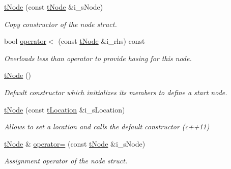 \begin{DoxyCompactItemize}
\mbox{\hyperlink{structplanner_1_1t_node_a18891f54e73f974f1142fba95887de98}{t\+Node}} (const \mbox{\hyperlink{structplanner_1_1t_node}{t\+Node}} \&i\+\_\+s\+Node)
\begin{DoxyCompactList}\small\item\em Copy constructor of the node struct. \end{DoxyCompactList}\item 
bool \mbox{\hyperlink{structplanner_1_1t_node_a5085f3fcf4a960ed9fe14068f1b5e950}{operator$<$}} (const \mbox{\hyperlink{structplanner_1_1t_node}{t\+Node}} \&i\+\_\+rhs) const
\begin{DoxyCompactList}\small\item\em Overloads less than operator to provide hasing for this node. \end{DoxyCompactList}\item 
\mbox{\hyperlink{structplanner_1_1t_node_a83ff217ef060b93698045b2357999594}{t\+Node}} ()
\begin{DoxyCompactList}\small\item\em Default constructor which initializes its members to define a start node. \end{DoxyCompactList}\item 
\mbox{\label{structplanner_1_1t_node_a6728fd921145674d77dec553aad10824}} 
\mbox{\hyperlink{structplanner_1_1t_node_a6728fd921145674d77dec553aad10824}{t\+Node}} (const \mbox{\hyperlink{structplanner_1_1t_location}{t\+Location}} \&i\+\_\+s\+Location)
\begin{DoxyCompactList}\small\item\em Allows to set a location and calls the default constructor (c++11) \end{DoxyCompactList}\item 
\mbox{\label{structplanner_1_1t_node_abcbfb81ac371e43234f66072547af049}} 
\mbox{\hyperlink{structplanner_1_1t_node}{t\+Node}} \& \mbox{\hyperlink{structplanner_1_1t_node_abcbfb81ac371e43234f66072547af049}{operator=}} (const \mbox{\hyperlink{structplanner_1_1t_node}{t\+Node}} \&i\+\_\+s\+Node)
\begin{DoxyCompactList}\small\item\em Assignment operator of the node struct. \end{DoxyCompactList}\item 
\mbox{\label{structplanner_1_1t_node_a18891f54e73f974f1142fba95887de98}} 

\end{DoxyCompactItemize}
